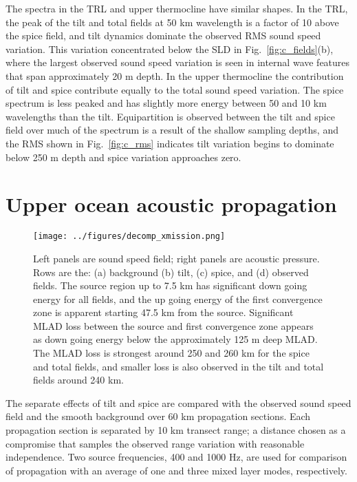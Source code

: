 \documentclass[preprint,NumberedRefs]{JASA}
\begin{document}
The spectra in the TRL and upper thermocline have similar shapes. In the TRL, the peak of the tilt and total fields at 50 km wavelength is a factor of 10 above the spice field, and tilt dynamics dominate the observed RMS sound speed variation. This variation concentrated below the SLD in Fig.~\ref{fig:c_fields}(b), where the largest observed sound speed variation is seen in internal wave features that span approximately 20 m depth. In the upper thermocline the contribution of tilt and spice contribute equally to the total sound speed variation. The spice spectrum is less peaked and has slightly more energy between 50 and 10 km wavelengths than the tilt. Equipartition is observed between the tilt and spice field over much of the spectrum is a result of the shallow sampling depths, and the RMS shown in Fig.~\ref{fig:c_rms} indicates tilt variation begins to dominate below 250 m depth and spice variation approaches zero.

\section{\label{sec:propagation}Upper ocean acoustic propagation}
\begin{figure}
\texttt{[image: ../figures/decomp\_xmission.png]}
    \caption{\label{fig:decomp_x}{Left panels are sound speed field; right panels are acoustic pressure. Rows are the: (a) background (b) tilt, (c) spice, and (d) observed fields. The source region up to 7.5 km has significant down going energy for all fields, and the up going energy of the first convergence zone is apparent starting 47.5 km from the source. Significant MLAD loss between the source and first convergence zone appears as down going energy below the approximately 125 m deep MLAD. The MLAD loss is strongest around 250 and 260 km for the spice and total fields, and smaller loss is also observed in the tilt and total fields around 240 km.}}
\end{figure}

The separate effects of tilt and spice are compared with the observed sound speed field and the smooth background over 60 km propagation sections. Each propagation section is separated by 10 km transect range; a distance chosen as a compromise that samples the observed range variation with reasonable independence. Two source frequencies, 400 and 1000 Hz, are used for comparison of propagation with an average of one and three mixed layer modes, respectively.
\end{document}
